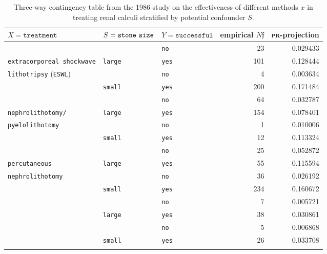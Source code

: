 \documentclass[10pt]{article}
\newcommand{\prob}[1]{\mathfrak{#1}}
\newcommand{\tablecolor}{beaublue}
\begin{document}
\begin{table}[!t]
\renewcommand{\arraystretch}{1.05}
    \centering
    \begin{tabular}{ll|l||rr}
    $X=\texttt{treatment}$ & $S=\texttt{stone\,\,size}$ & $Y=\texttt{successful}$ & empirical $N\prob f$ & \textsc{pr}-projection\\\hline
     &  & \texttt{no} & 23 & 0.029433\\
    \texttt{extracorporeal\,shockwave} & \multirow{-2}{*}{\texttt{large}} & \texttt{yes} & 101 & 0.128444\\
     \rowcolor{\tablecolor}
    \texttt{lithotripsy} (\texttt{ESWL}) & & \texttt{no} & 4 & 0.003634\\
    \rowcolor{\tablecolor}
     & \multirow{-2}{*}{\texttt{small}} & \texttt{yes} & 200& 0.171484\\ \hdashline
    & & \texttt{no} & 64 & 0.032787\\
    \texttt{nephrolithotomy/} & \multirow{-2}{*}{\texttt{large}} & \texttt{yes} & 154 & 0.078401\\
    \rowcolor{\tablecolor}
    \texttt{pyelolithotomy} & & \texttt{no} & 1 & 0.010006\\
    \rowcolor{\tablecolor}
     & \multirow{-2}{*}{\texttt{small}} & \texttt{yes} & 12& 0.113324\\ \hdashline
    & & \texttt{no} & 25 & 0.052872\\
    \texttt{percutaneous} & \multirow{-2}{*}{\texttt{large}} & \texttt{yes} & 55 & 0.115594\\
    \rowcolor{\tablecolor}
    \texttt{nephrolithotomy} & & \texttt{no} & 36 & 0.026192\\
    \rowcolor{\tablecolor}
     & \multirow{-2}{*}{\texttt{small}} & \texttt{yes} & 234 & 0.160672\\ \hdashline
     &  & \texttt{no} & 7 & 0.005721\\
     & \multirow{-2}{*}{\texttt{large}} & \texttt{yes} & 38 & 0.030861\\
     \rowcolor{\tablecolor}
    & & \texttt{no} & 5 & 0.006868\\
    \rowcolor{\tablecolor}
    \multirow{-4}{*}{\texttt{pyelolithotomy}} & \multirow{-2}{*}{\texttt{small}} & \texttt{yes} & 26 & 0.033708\\ \hdashline
    \end{tabular}
    \caption{Three-way contingency table from the 1986 study on the effectiveness of different methods $x$ in treating renal calculi stratified by potential confounder $S$.}
    \label{tb:Kidney}
\end{table}
\end{document}
